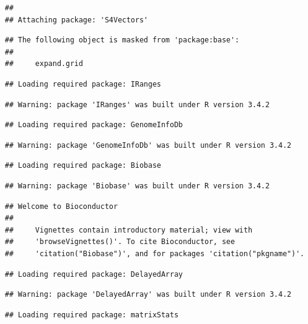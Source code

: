 \documentclass[]{article}
\begin{document}
\begin{verbatim}
## 
## Attaching package: 'S4Vectors'
\end{verbatim}

\begin{verbatim}
## The following object is masked from 'package:base':
## 
##     expand.grid
\end{verbatim}

\begin{verbatim}
## Loading required package: IRanges
\end{verbatim}

\begin{verbatim}
## Warning: package 'IRanges' was built under R version 3.4.2
\end{verbatim}

\begin{verbatim}
## Loading required package: GenomeInfoDb
\end{verbatim}

\begin{verbatim}
## Warning: package 'GenomeInfoDb' was built under R version 3.4.2
\end{verbatim}

\begin{verbatim}
## Loading required package: Biobase
\end{verbatim}

\begin{verbatim}
## Warning: package 'Biobase' was built under R version 3.4.2
\end{verbatim}

\begin{verbatim}
## Welcome to Bioconductor
## 
##     Vignettes contain introductory material; view with
##     'browseVignettes()'. To cite Bioconductor, see
##     'citation("Biobase")', and for packages 'citation("pkgname")'.
\end{verbatim}

\begin{verbatim}
## Loading required package: DelayedArray
\end{verbatim}

\begin{verbatim}
## Warning: package 'DelayedArray' was built under R version 3.4.2
\end{verbatim}

\begin{verbatim}
## Loading required package: matrixStats
\end{verbatim}
\end{document}
